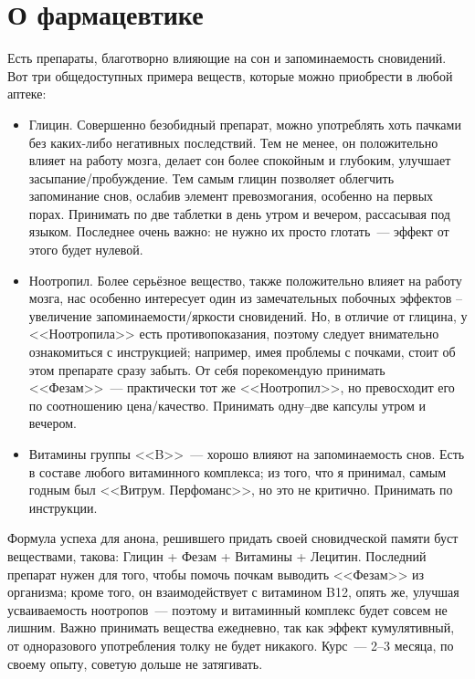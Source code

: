 \documentclass[a4paper,14pt,oneside]{memoir}
\begin{document}
\section{О фармацевтике}

Есть препараты, благотворно влияющие на сон и запоминаемость сновидений. Вот три общедоступных примера веществ, которые можно приобрести в любой аптеке:

\begin{itemize}
\item Глицин. Совершенно безобидный препарат, можно употреблять хоть пачками без каких-либо негативных последствий. Тем не менее, он положительно влияет на работу мозга,  делает сон более спокойным и глубоким, улучшает засыпание/пробуждение. Тем самым глицин позволяет облегчить запоминание снов, ослабив элемент превозмогания, особенно на первых порах. Принимать по две таблетки в день утром и вечером, рассасывая под языком. Последнее очень важно: не нужно их просто глотать~--- эффект от этого будет нулевой.

\item Ноотропил. Более серьёзное вещество, также положительно влияет на работу мозга, нас особенно интересует один из замечательных побочных эффектов – увеличение запоминаемости/яркости сновидений. Но, в отличие от глицина, у <<Ноотропила>> есть противопоказания, поэтому следует внимательно ознакомиться с инструкцией; например, имея проблемы с почками, стоит об этом препарате сразу забыть. От себя порекомендую принимать <<Фезам>>~--- практически тот же <<Ноотропил>>, но превосходит его по соотношению цена/качество. Принимать одну--две капсулы утром и вечером.

\item Витамины группы <<B>>~--- хорошо влияют на запоминаемость снов. Есть в составе любого витаминного комплекса; из того, что я принимал, самым годным был <<Витрум. Перфоманс>>, но это не критично. Принимать по инструкции.
\end{itemize}

Формула успеха для анона, решившего придать своей сновидческой памяти буст веществами, такова:  Глицин + Фезам + Витамины + Лецитин. Последний препарат нужен для того, чтобы помочь почкам выводить <<Фезам>> из организма; кроме того, он взаимодействует с витамином B12, опять же, улучшая усваиваемость ноотропов~--- поэтому и витаминный комплекс будет совсем не лишним. Важно принимать вещества ежедневно, так как эффект кумулятивный, от одноразового употребления толку не будет никакого. Курс~--- 2--3 месяца, по своему опыту, советую дольше не затягивать.
\end{document}
